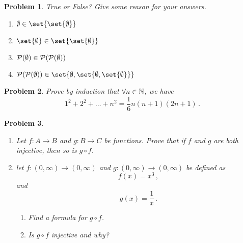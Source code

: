 \documentclass[]{exam}  %
\newtheorem{problem}{Problem}
\begin{document}
    \begin{problem}
        True or False? Give some reason for your answers.
        \begin{enumerate}
            \item $\emptyset \in \set{\set{ \emptyset}}$
            \item $\set{\emptyset} \in \set{\set{\emptyset}}$
            \item $\mathcal{P}(\emptyset) \in \mathcal{P}(\mathcal{P}(\emptyset))$
            \item $\cP(\cP (\emptyset )) \in \set{\emptyset, \set{\emptyset, \set{\emptyset}}}$
        \end{enumerate}
    \end{problem}

    \newpage
    \begin{problem}
        Prove by induction that $\forall n \in \mathbb{N}$, we have
        \begin{equation*}
            1^2 + 2^2 + \dots + n^2 = \frac{1}{6} n (n + 1)(2n + 1) \,.
        \end{equation*}
    \end{problem}


    \newpage

    \begin{problem}
        \begin{enumerate}
            \item Let $f:A \to B$ and $g:B\to C$ be functions.
        Prove that if $f$ and $g$ are both injective, then so is $g\circ f$.
            \item let $f:(0,\infty) \to (0,\infty)$ and $g:(0,\infty) \to (0,\infty)$
                be defined as
                \begin{equation*}
                    f(x) = x^3  \,,
                \end{equation*}
                and
                \begin{equation*}
                    g(x) = \frac{1}{x} \,.
                \end{equation*}
                \begin{enumerate}
                    \item Find a formula for $g \circ f$.
                    \item Is $g \circ f$ injective and why?
                \end{enumerate}
        \end{enumerate}
    \end{problem}
\end{document}
